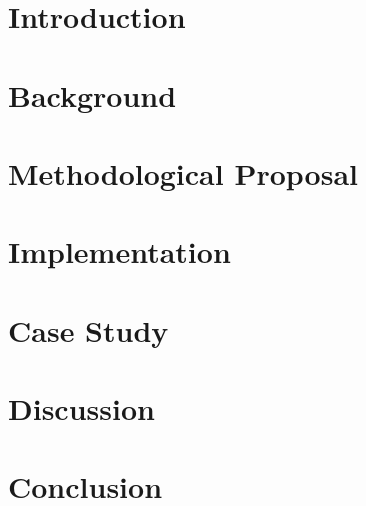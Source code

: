 \documentclass[10pt, a4paper, twocolumn]{article} %
\begin{document}
\section{Introduction}


\section{Background}


\section{Methodological Proposal}


\section{Implementation}


\section{Case Study}


\section{Discussion}


\section{Conclusion}


\clearpage
\printbibliography[title={Bibliography}] %


\end{document}
